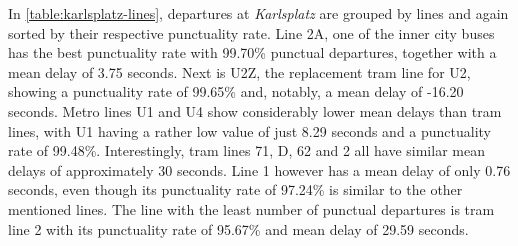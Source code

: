 In \cref{table:karlsplatz-lines}, departures at \textit{Karlsplatz} are grouped by lines and again sorted by their respective punctuality rate. Line 2A, one of the inner city buses has the best punctuality rate with 99.70\% punctual departures, together with a mean delay of 3.75 seconds. Next is U2Z, the replacement tram line for U2, showing a punctuality rate of 99.65\% and, notably, a mean delay of -16.20 seconds. Metro lines U1 and U4 show considerably lower mean delays than tram lines, with U1 having a rather low value of just 8.29 seconds and a punctuality rate of 99.48\%. Interestingly, tram lines 71, D, 62 and 2 all have similar mean delays of approximately 30 seconds. Line 1 however has a mean delay of only 0.76 seconds, even though its punctuality rate of 97.24\% is similar to the other mentioned lines. The line with the least number of punctual departures is tram line 2 with its punctuality rate of 95.67\% and mean delay of 29.59 seconds.